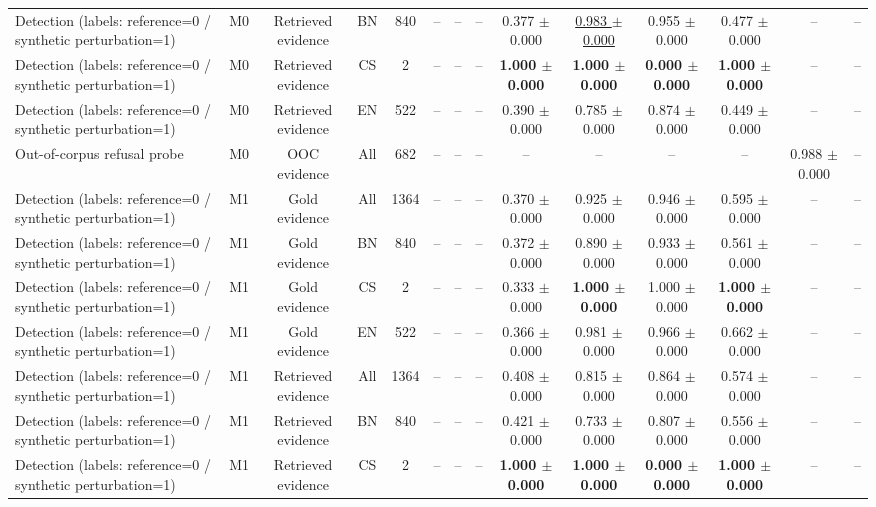 \begin{table}[t]
{\begin{tabular}{lccccccccccccc}
Detection (labels: reference=0 / synthetic perturbation=1) & M0 & Retrieved evidence & BN & 840 & -- & -- & -- & 0.377 $\pm$ 0.000 & \underline{0.983 $\pm$ 0.000} & 0.955 $\pm$ 0.000 & 0.477 $\pm$ 0.000 & -- & -- \\
Detection (labels: reference=0 / synthetic perturbation=1) & M0 & Retrieved evidence & CS & 2 & -- & -- & -- & \textbf{1.000 $\pm$ 0.000} & \textbf{1.000 $\pm$ 0.000} & \textbf{0.000 $\pm$ 0.000} & \textbf{1.000 $\pm$ 0.000} & -- & -- \\
Detection (labels: reference=0 / synthetic perturbation=1) & M0 & Retrieved evidence & EN & 522 & -- & -- & -- & 0.390 $\pm$ 0.000 & 0.785 $\pm$ 0.000 & 0.874 $\pm$ 0.000 & 0.449 $\pm$ 0.000 & -- & -- \\
\midrule
Out-of-corpus refusal probe & M0 & OOC evidence & All & 682 & -- & -- & -- & -- & -- & -- & -- & 0.988 $\pm$ 0.000 & -- \\
\midrule
Detection (labels: reference=0 / synthetic perturbation=1) & M1 & Gold evidence & All & 1364 & -- & -- & -- & 0.370 $\pm$ 0.000 & 0.925 $\pm$ 0.000 & 0.946 $\pm$ 0.000 & 0.595 $\pm$ 0.000 & -- & -- \\
Detection (labels: reference=0 / synthetic perturbation=1) & M1 & Gold evidence & BN & 840 & -- & -- & -- & 0.372 $\pm$ 0.000 & 0.890 $\pm$ 0.000 & 0.933 $\pm$ 0.000 & 0.561 $\pm$ 0.000 & -- & -- \\
Detection (labels: reference=0 / synthetic perturbation=1) & M1 & Gold evidence & CS & 2 & -- & -- & -- & 0.333 $\pm$ 0.000 & \textbf{1.000 $\pm$ 0.000} & 1.000 $\pm$ 0.000 & \textbf{1.000 $\pm$ 0.000} & -- & -- \\
Detection (labels: reference=0 / synthetic perturbation=1) & M1 & Gold evidence & EN & 522 & -- & -- & -- & 0.366 $\pm$ 0.000 & 0.981 $\pm$ 0.000 & 0.966 $\pm$ 0.000 & 0.662 $\pm$ 0.000 & -- & -- \\
Detection (labels: reference=0 / synthetic perturbation=1) & M1 & Retrieved evidence & All & 1364 & -- & -- & -- & 0.408 $\pm$ 0.000 & 0.815 $\pm$ 0.000 & 0.864 $\pm$ 0.000 & 0.574 $\pm$ 0.000 & -- & -- \\
Detection (labels: reference=0 / synthetic perturbation=1) & M1 & Retrieved evidence & BN & 840 & -- & -- & -- & 0.421 $\pm$ 0.000 & 0.733 $\pm$ 0.000 & 0.807 $\pm$ 0.000 & 0.556 $\pm$ 0.000 & -- & -- \\
Detection (labels: reference=0 / synthetic perturbation=1) & M1 & Retrieved evidence & CS & 2 & -- & -- & -- & \textbf{1.000 $\pm$ 0.000} & \textbf{1.000 $\pm$ 0.000} & \textbf{0.000 $\pm$ 0.000} & \textbf{1.000 $\pm$ 0.000} & -- & -- \\

\end{tabular}}
\end{table}
